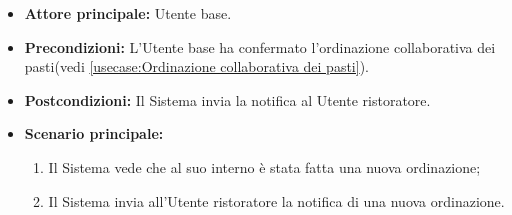 \label{usecase:Notifica ordine}
\begin{itemize}
	\item \textbf{Attore principale:} Utente base.
	
	\item \textbf{Precondizioni:} L'Utente base ha confermato l'ordinazione collaborativa dei pasti(vedi \autoref{usecase:Ordinazione collaborativa dei pasti}).

	\item \textbf{Postcondizioni:} Il Sistema invia la notifica al Utente ristoratore.
     
	\item \textbf{Scenario principale:}
	      \begin{enumerate}
                \item Il Sistema vede che al suo interno è stata fatta una nuova ordinazione;
                \item Il Sistema invia all'Utente ristoratore la notifica di una nuova ordinazione.
	      \end{enumerate}
\end{itemize}